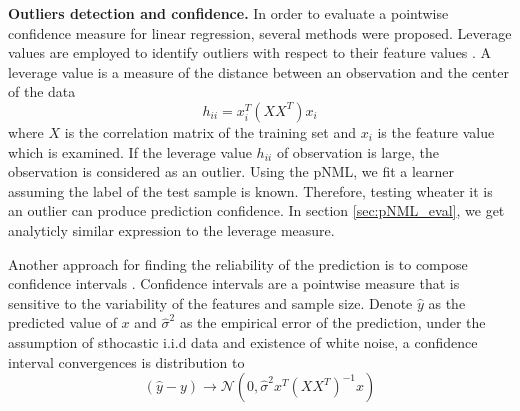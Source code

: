 \documentclass[conference,letterpaper]{IEEEtran}
\begin{document}
\textbf{Outliers detection and confidence.}
In order to evaluate a pointwise confidence measure for linear regression, several methods were proposed. 
Leverage values are employed to identify outliers with respect to their feature values \cite{cardinali2013observation}. 
A leverage value is a measure of the distance between an observation and the center of the data
\begin{equation}
h_{ii}=x_i^T(XX^T)x_i
\end{equation}
where $X$ is the correlation matrix of the training set and $x_i$ is the feature value which is examined.
If the leverage value $h_{ii}$ of observation is large, the observation is considered as an outlier.
Using the pNML, we fit a learner assuming the label of the test sample is known. 
Therefore, testing wheater it is an outlier can produce prediction confidence.
In section \ref{sec:pNML_eval}, we get analyticly similar expression to the leverage measure.

Another approach for finding the reliability of the prediction is to compose confidence intervals \cite{trevor2009elements}.
Confidence intervals are a pointwise measure that is sensitive to the variability of the features and sample size.
Denote $\hat{y}$ as the predicted value of $x$ and  $\hat{\sigma}^2$ as the empirical error of the prediction, under the assumption of sthocastic i.i.d data and existence of white noise, a confidence interval convergences is distribution to
\begin{equation}
(\hat{y} - y) \xrightarrow{} \mathcal{N}(0, \hat{\sigma}^2 x^T(XX^T)^{-1}x)
\end{equation}


\end{document}
